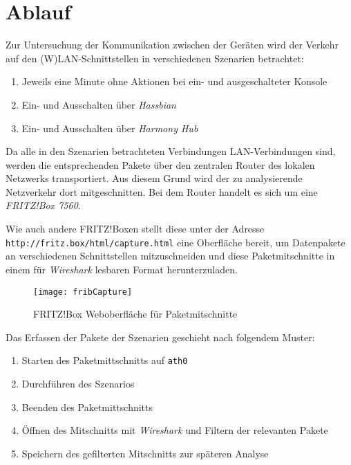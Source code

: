 \newpage
\section{Ablauf}\label{sec:ablauf}
Zur Untersuchung der Kommunikation zwischen der Geräten wird der Verkehr auf den
(W)LAN-Schnittstellen in verschiedenen Szenarien betrachtet:

\begin{enumerate}
    \setlength\itemsep{-0.5em}
    \item Jeweils eine Minute ohne Aktionen bei ein- und ausgeschalteter Konsole
    \item Ein- und Ausschalten über \textit{Hassbian}
    \item Ein- und Ausschalten über \textit{Harmony Hub}
\end{enumerate}

Da alle in den Szenarien betrachteten Verbindungen LAN-Verbindungen sind,
werden die entsprechenden Pakete über den zentralen Router des lokalen Netzwerks transportiert.
Aus diesem Grund wird der zu analysierende Netzverkehr dort mitgeschnitten.
Bei dem Router handelt es sich um eine \textit{FRITZ!Box 7560}.

Wie auch andere FRITZ!Boxen stellt diese unter der Adresse \nolinkurl{http://fritz.box/html/capture.html} eine Oberfläche bereit,
um Datenpakete an verschiedenen Schnittstellen mitzuschneiden und diese Paketmitschnitte
in einem für \textit{Wireshark} lesbaren Format herunterzuladen.

\begin{figure}[ht!]
    \centering
    \texttt{[image: fribCapture]}
    \caption{FRITZ!Box Weboberfläche für Paketmitschnitte}\label{fig:fribCapture}
\end{figure}

Das Erfassen der Pakete der Szenarien geschieht nach folgendem Muster:
\begin{enumerate}
    \setlength\itemsep{-0.5em}
    \item Starten des Paketmittschnitts auf \texttt{ath0}
    \item Durchführen des Szenarios
    \item Beenden des Paketmittschnitts
    \item Öffnen des Mitschnitts mit \textit{Wireshark} und Filtern der relevanten Pakete
    \item Speichern des gefilterten Mitschnitts zur späteren Analyse
\end{enumerate}
